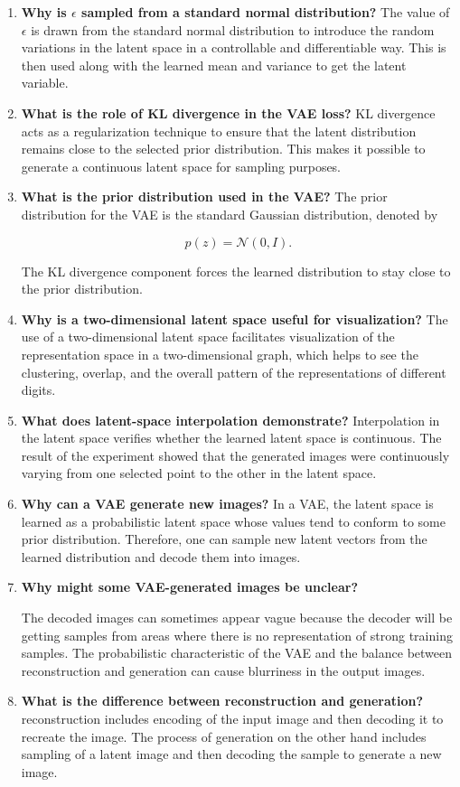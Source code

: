 \documentclass[10pt]{article}
\begin{document}
\begin{enumerate}
\item \textbf{Why is $\epsilon$ sampled from a standard normal distribution?}
The value of $\epsilon$ is drawn from the standard normal distribution to introduce the random variations in the latent space in a controllable and differentiable way. This is then used along with the learned mean and variance to get the latent variable.

\item \textbf{What is the role of KL divergence in the VAE loss?}
KL divergence acts as a regularization technique to ensure that the latent distribution remains close to the selected prior distribution. This makes it possible to generate a continuous latent space for sampling purposes.

\item \textbf{What is the prior distribution used in the VAE?}
The prior distribution for the VAE is the standard Gaussian distribution, denoted by

\[
p(z)=\mathcal{N}(0,I).
\]

The KL divergence component forces the learned distribution to stay close to the prior distribution.

\item \textbf{Why is a two-dimensional latent space useful for visualization?}
The use of a two-dimensional latent space facilitates visualization of the representation space in a two-dimensional graph, which helps to see the clustering, overlap, and the overall pattern of the representations of different digits.
\item \textbf{What does latent-space interpolation demonstrate?}
Interpolation in the latent space verifies whether the learned latent space is continuous. The result of the experiment showed that the generated images were continuously varying from one selected point to the other in the latent space.

\item \textbf{Why can a VAE generate new images?}
In a VAE, the latent space is learned as a probabilistic latent space whose values tend to conform to some prior distribution. Therefore, one can sample new latent vectors from the learned distribution and decode them into images.

\item \textbf{Why might some VAE-generated images be unclear?}

The decoded images can sometimes appear vague because the decoder will be getting samples from areas where there is no representation of strong training samples. The probabilistic characteristic of the VAE and the balance between reconstruction and generation can cause blurriness in the output images.
\item \textbf{What is the difference between reconstruction and generation?}
reconstruction includes encoding of the input image and then decoding it to recreate the image. The process of generation on the other hand includes sampling of a latent image and then decoding the sample to generate a new image.


\end{enumerate}
\end{document}
